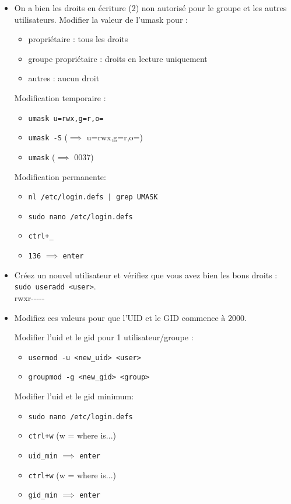 \documentclass[a4paper]{article}
\begin{document}
\begin{itemize}
\item On a bien les droits en écriture (2) non autorisé pour le groupe et les autres utilisateurs. Modifier la valeur de l’umask pour :
\begin{itemize}
    \item propriétaire : tous les droits
    \item groupe propriétaire : droits en lecture uniquement
    \item autres : aucun droit
\end{itemize}
\begin{example}
    Modification temporaire :
    \begin{itemize}
        \item \texttt{umask u=rwx,g=r,o=}
        \item \texttt{umask -S} ($ \implies $ u=rwx,g=r,o=)
        \item \texttt{umask} ($ \implies $ 0037)
    \end{itemize}
    Modification permanente:
    \begin{itemize}
        \item \texttt{nl /etc/login.defs | grep UMASK}
        \item \texttt{sudo nano /etc/login.defs}
        \item \texttt{ctrl+\_}
        \item \texttt{136} $ \implies $ \texttt{enter}
    \end{itemize}
\end{example}

\item Créez un nouvel utilisateur et vérifiez que vous avez bien les bons droits : \texttt{sudo useradd <user>}. \\
rwxr-{}-{}-{}-{}-

\item Modifiez ces valeurs pour que l’UID et le GID commence à 2000.
\begin{example}
    Modifier l'uid et le gid pour 1 utilisateur/groupe :
    \begin{itemize}
        \item \texttt{usermod -u <new\_uid> <user>}
        \item \texttt{groupmod -g <new\_gid> <group>}
    \end{itemize}
    Modifier l'uid et le gid minimum:
    \begin{itemize}
        \item \texttt{sudo nano /etc/login.defs}
        \item \texttt{ctrl+w} (w = where is...)
        \item \texttt{uid\_min} $ \implies $ \texttt{enter}
        \item \texttt{ctrl+w} (w = where is...)
        \item \texttt{gid\_min} $ \implies $ \texttt{enter}
    \end{itemize}
\end{example}


\end{itemize}
\end{document}
